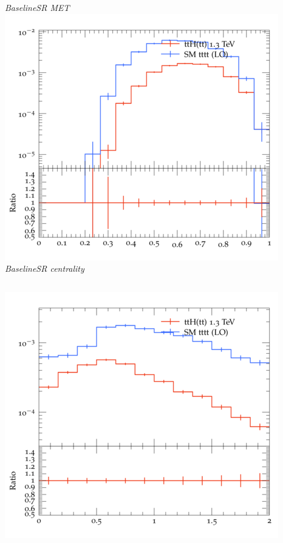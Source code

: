 \documentclass{beamer}
\begin{document}
\begin{frame}
\begin{columns}
\textit{\small BaselineSR MET}
\includegraphics[width=\textwidth]{../plots/ttH_1300/tttt_ttH_1LOS/BaselineSR_centrality.png}\\
\textit{\small BaselineSR centrality}
\end{columns}
\begin{columns}
\includegraphics[width=\textwidth]{../plots/ttH_1300/tttt_ttH_1LOS/BaselineSR_deltaR_bl_min.png}\\

\end{columns}
\end{frame}
\end{document}
